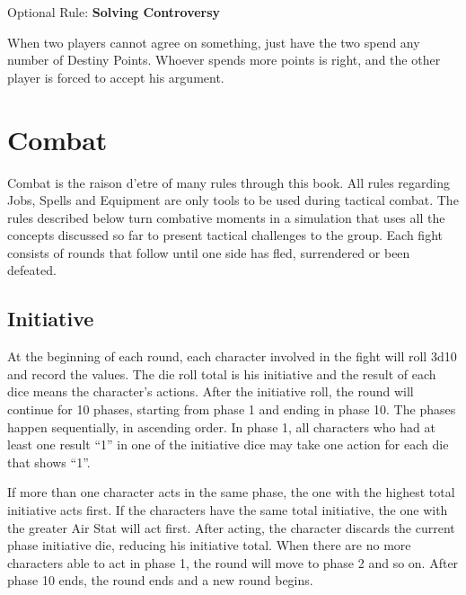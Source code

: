 \begin{multicols}{2}
\begin{boco}
Optional Rule: \textbf{Solving Controversy}\pc%

When two players cannot agree on something, just have the two spend any number of Destiny Points. Whoever spends more points is right, and the other player is forced to accept his argument.
\end{boco}
\end{multicols}

\begin{center}
\end{center}
\clearpage
\section{Combat}\label{sec:combat}
\begin{multicols}{2}
Combat is the raison d’etre of many rules through this book. All rules regarding Jobs, Spells and Equipment are only tools to be used during tactical combat. The rules described below turn combative moments in a simulation that uses all the concepts discussed so far to present tactical challenges to the group. Each fight consists of rounds that follow until one side has fled, surrendered or been defeated.

\subsection{Initiative}\label{subsec:init}
At the beginning of each round, each character involved in the fight will roll 3d10 and record the values. The die roll total is his initiative and the result of each dice means the character's actions. After the initiative roll, the round will continue for 10 phases, starting from phase 1 and ending in phase 10. The phases happen sequentially, in ascending order. In phase 1, all characters who had at least one result “1” in one of the initiative dice may take one action for each die that shows “1”.

If more than one character acts in the same phase, the one with the highest total initiative acts first. If the characters have the same total initiative, the one with the greater Air Stat will act first. After acting, the character discards the current phase initiative die, reducing his initiative total. When there are no more characters able to act in phase 1, the round will move to phase 2 and so on. After phase 10 ends, the round ends and a new round begins.


\end{multicols}
